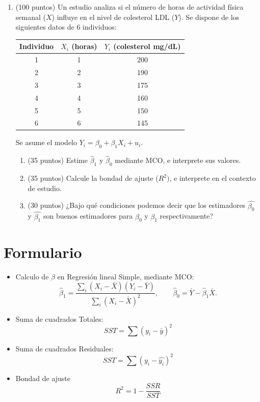 \documentclass[10pt,a4paper]{article}
\begin{document}
 
\begin{enumerate}
    \item (100 puntos)
Un estudio analiza si el número de horas de actividad física semanal ($X$) influye en el nivel de colesterol LDL ($Y$). 
Se dispone de los siguientes datos de 6 individuos:

\begin{center}
\begin{tabular}{|c| c| c|}
\hline
Individuo & $X_i$ (horas) & $Y_i$ (colesterol mg/dL)\\
\hline
1 & 1 & 200\\
2 & 2 & 190\\
3 & 3 & 175\\
4 & 4 & 160\\
5 & 5 & 150\\
6 & 6 & 145\\
\hline
\end{tabular}
\end{center}

Se asume el modelo $Y_i=\beta_0+\beta_1 X_i+u_i$.

\begin{enumerate}

\item (35 puntos) Estime $\hat{\beta}_1$ y $\hat{\beta}_0$ mediante MCO, e interprete sus valores.

\item (35 puntos) Calcule la bondad de ajuste ($R^2)$, e interprete en el contexto de estudio.


\item (30 puntos) ¿Bajo qué condiciones podemos decir que los estimadores $\hat{\beta_0}$ y $\hat{\beta_1}$ son buenos estimadores para $\beta_0$ y $\beta_1$ respectivamente?

\end{enumerate}




\end{enumerate}


\newpage
\section{Formulario}
\begin{itemize}

\item Calculo de $\beta$ en Regresión lineal Simple, mediante MCO:
\[
\hat{\beta}_1=\frac{\sum_i (X_i-\bar{X})(Y_i-\bar{Y})}{\sum_i (X_i-\bar{X})^2},\qquad
\hat{\beta}_0=\bar{Y}-\hat{\beta}_1\bar{X}.
\]

\item Suma de cuadrados Totales:
$$SST=\sum (y_i-\bar{y})^2$$

\item Suma de cuadrados Residuales:
$$SST=\sum (y_i-\hat{y_i})^2$$

\item Bondad de ajuste
$$R^2 = 1-\frac{SSR}{SST}$$

\end{itemize}
 
\end{document}
